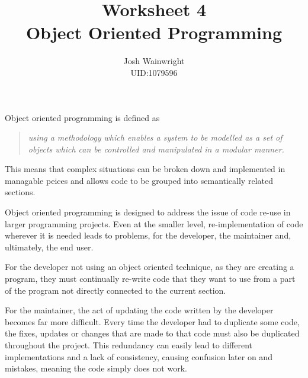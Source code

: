 \documentclass[11pt]{article} %
\author{Josh Wainwright \\ UID:1079596}
\title{Worksheet 4 \\ Object Oriented Programming}
\date{}
\begin{document}
\maketitle

Object oriented programming is defined as

\begin{quote}
	\textit{using a methodology which enables a system to be modelled as a set
	of objects which can be controlled and manipulated in a modular manner.}
\end{quote}

This means that complex situations can be broken down and implemented in
managable peices and allows code to be grouped into semantically related
sections.

Object oriented programming is designed to address the issue of code re-use in
larger programming projects. Even at the smaller level, re-implementation of
code wherever it is needed leads to problems, for the developer, the maintainer
and, ultimately, the end user.

For the developer not using an object oriented technique, as they are creating
a program, they must continually re-write code that they want to use from a
part of the program not directly connected to the current section.

For the maintainer, the act of updating the code written by the developer
becomes far more difficult. Every time the developer had to duplicate some
code, the fixes, updates or changes that are made to that code must also be
duplicated throughout the project. This redundancy can easily lead to different
implementations and a lack of consistency, causing confusion later on and
mistakes, meaning the code simply does not work.
\end{document}
